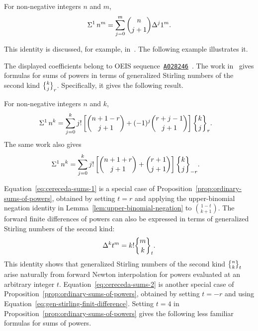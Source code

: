 \begin{corollary}
  For non-negative integers $n$ and $m$,
  \begin{align*}
    \Sigma^{1}\,{n}^{m} = \sum_{j=0}^{m} \binom{n}{j+1} \Delta^{j} 1^m.
  \end{align*}
\end{corollary}
This identity is discussed, for example, in~\cite{cereceda2022sums}. The following example illustrates it.

The displayed coefficients belong to OEIS sequence~\href{https://oeis.org/A028246}{\texttt{A028246}}~\cite{sloane2003line}.
The work in~\cite{cereceda2022sums} gives formulas for sums of powers in terms of generalized Stirling numbers of the second kind $\stirlingii{k}{j}_{r}$. Specifically, it gives the following result.
\begin{proposition}[Cereceda (2022)]
  For non-negative integers $n$ and $k$,
  \begin{align}
    \label{eq:cereceda-sums-1}
    \KnuthRFoldSum{1}{n}{k} &= \sum_{j=0}^{k} j!
    \left[
      \binom{n+1-r}{j+1} + (-1)^j \binom{r+j-1}{j+1}
    \right] \stirlingii{k}{j}_{r}.
  \end{align}
  The same work also gives
  \begin{align}
    \label{eq:cereceda-sums-2}
    \KnuthRFoldSum{1}{n}{k} &= \sum_{j=0}^{k} j!
    \left[
      \binom{n+1+r}{j+1} + \binom{r+1}{j+1}
    \right] \stirlingii{k}{j}_{-r}.
  \end{align}
\end{proposition}
Equation~\eqref{eq:cereceda-sums-1} is a special case of Proposition~\eqref{prop:ordinary-sums-of-powers}, obtained by setting $t=r$ and applying the upper-binomial negation identity in Lemma~\eqref{lem:upper-binomial-negation} to $\binom{1-t}{k+1}$. The forward finite differences of powers can also be expressed in terms of generalized Stirling numbers of the second kind:
\begin{align}
  \label{eq:gen-stirling-finit-difference}
  \Delta^{k} t^m = k! \stirlingii{m}{k}_{t}.
\end{align}
This identity shows that generalized Stirling numbers of the second kind $\stirlingii{n}{k}_t$ arise naturally from forward Newton interpolation for powers evaluated at an arbitrary integer $t$. Equation~\eqref{eq:cereceda-sums-2} is another special case of Proposition~\eqref{prop:ordinary-sums-of-powers}, obtained by setting $t=-r$ and using Equation~\eqref{eq:gen-stirling-finit-difference}.
Setting $t=4$ in Proposition~\eqref{prop:ordinary-sums-of-powers} gives the following less familiar formulas for sums of powers.
